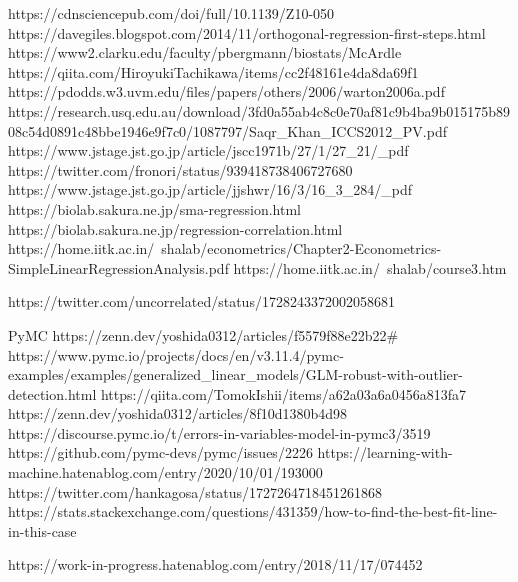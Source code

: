 https://cdnsciencepub.com/doi/full/10.1139/Z10-050
https://davegiles.blogspot.com/2014/11/orthogonal-regression-first-steps.html
https://www2.clarku.edu/faculty/pbergmann/biostats/McArdle%
https://qiita.com/HiroyukiTachikawa/items/cc2f48161e4da8da69f1
https://pdodds.w3.uvm.edu/files/papers/others/2006/warton2006a.pdf
https://research.usq.edu.au/download/3fd0a55ab4c8c0e70af81c9b4ba9b015175b8908c54d0891c48bbe1946e9f7c0/1087797/Saqr_Khan_ICCS2012_PV.pdf
https://www.jstage.jst.go.jp/article/jscc1971b/27/1/27_21/_pdf
https://twitter.com/fronori/status/939418738406727680
https://www.jstage.jst.go.jp/article/jjshwr/16/3/16_3_284/_pdf
https://biolab.sakura.ne.jp/sma-regression.html
https://biolab.sakura.ne.jp/regression-correlation.html
https://home.iitk.ac.in/~shalab/econometrics/Chapter2-Econometrics-SimpleLinearRegressionAnalysis.pdf
https://home.iitk.ac.in/~shalab/course3.htm



https://twitter.com/uncorrelated/status/1728243372002058681

PyMC
https://zenn.dev/yoshida0312/articles/f5579f88e22b22#%
https://www.pymc.io/projects/docs/en/v3.11.4/pymc-examples/examples/generalized_linear_models/GLM-robust-with-outlier-detection.html
https://qiita.com/TomokIshii/items/a62a03a6a0456a813fa7
https://zenn.dev/yoshida0312/articles/8f10d1380b4d98
https://discourse.pymc.io/t/errors-in-variables-model-in-pymc3/3519
https://github.com/pymc-devs/pymc/issues/2226
https://learning-with-machine.hatenablog.com/entry/2020/10/01/193000
https://twitter.com/hankagosa/status/1727264718451261868
https://stats.stackexchange.com/questions/431359/how-to-find-the-best-fit-line-in-this-case

https://work-in-progress.hatenablog.com/entry/2018/11/17/074452

\fi